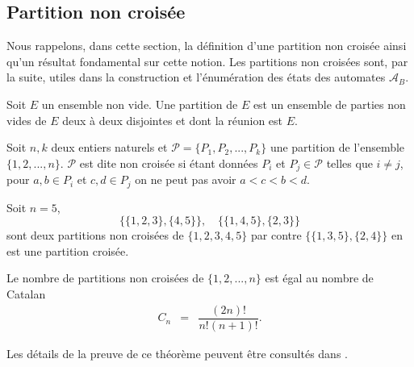 
\begin{spacing}{0.27}
\section{Partition non croisée}
\end{spacing}
Nous rappelons, dans cette section, la définition d'une partition non croisée ainsi qu'un résultat fondamental sur cette notion. Les partitions non croisées sont, par la suite, utiles dans la construction et l’énumération des états des automates $\mathcal{A}_{B}$.
\begin{Def}\label{par202}
Soit $E$ un ensemble non vide. Une partition de $E$ est un ensemble de parties non vides de $E$ deux à deux disjointes et dont la réunion est $E$. 
\end{Def}
\begin{Def}\label{partcr1}
Soit $n, k$ deux entiers naturels et $\mathcal{P}=\{P_{1}, P_{2},...,P_{k}\}$ une partition de l'ensemble $\{1,2,...,n\}$. $\mathcal{P}$ est dite non croisée si étant données  $ P_{i}$ et $P_{j}\in \mathcal{P}$ telles que $i\neq j$, pour $a,b\in P_{i} $ et $c,d\in P_{j}$ on ne peut pas avoir $a<c<b<d$.
\end{Def}
\begin{Ex}\label{exparcr1}
Soit $n=5$,  $$\{\{1,2,3\},\{4,5\}\}, \quad \{\{1,4,5\},\{2,3\}\}$$ sont deux partitions non croisées de $\{1,2,3,4,5\}$ par contre  $\{\{1,3,5\},\{2,4\}\}$ en est une partition croisée.
\end{Ex}
\begin{Theo}\label{cat}
Le nombre de partitions non croisées de $\{1,2,...,n\}$ est égal au nombre de Catalan
\begin{eqnarray}
C_{n} & = & \dfrac{(2n)!}{n!(n+1)!}. 
\end{eqnarray}
\end{Theo}
 Les détails de la preuve de ce théorème peuvent être consultés dans \citep{Kre}.
 